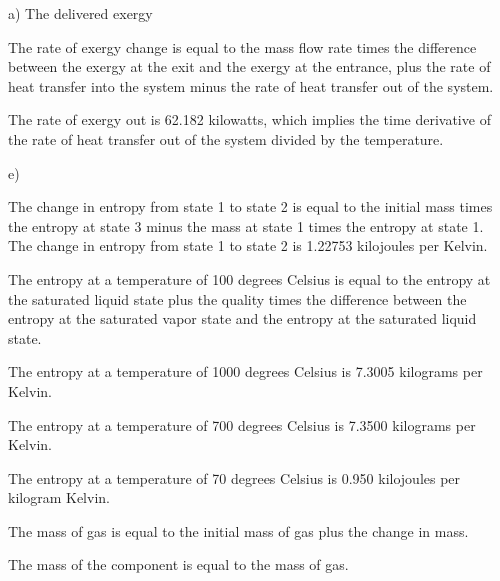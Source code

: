 a) The delivered exergy

The rate of exergy change is equal to the mass flow rate times the difference between the exergy at the exit and the exergy at the entrance, plus the rate of heat transfer into the system minus the rate of heat transfer out of the system.

The rate of exergy out is 62.182 kilowatts, which implies the time derivative of the rate of heat transfer out of the system divided by the temperature.

e)

The change in entropy from state 1 to state 2 is equal to the initial mass times the entropy at state 3 minus the mass at state 1 times the entropy at state 1. The change in entropy from state 1 to state 2 is 1.22753 kilojoules per Kelvin.

The entropy at a temperature of 100 degrees Celsius is equal to the entropy at the saturated liquid state plus the quality times the difference between the entropy at the saturated vapor state and the entropy at the saturated liquid state.

The entropy at a temperature of 1000 degrees Celsius is 7.3005 kilograms per Kelvin.

The entropy at a temperature of 700 degrees Celsius is 7.3500 kilograms per Kelvin.

The entropy at a temperature of 70 degrees Celsius is 0.950 kilojoules per kilogram Kelvin.

The mass of gas is equal to the initial mass of gas plus the change in mass.

The mass of the component is equal to the mass of gas.